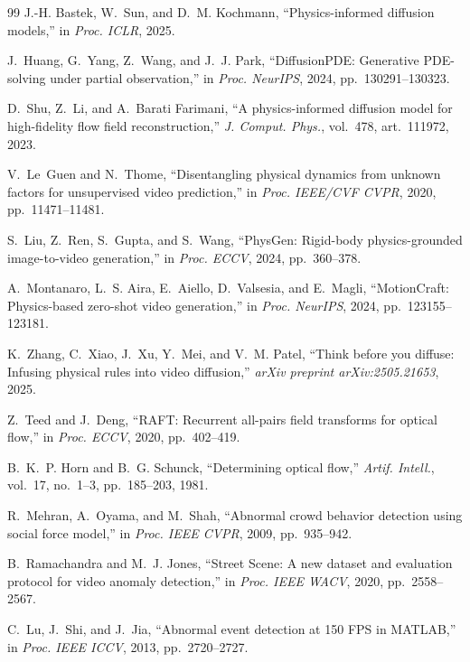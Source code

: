 \documentclass[11pt,a4paper]{article}
\begin{document}
\begin{thebibliography}{99}
J.-H. Bastek, W.~Sun, and D.~M. Kochmann, ``Physics-informed diffusion models,'' in \emph{Proc. ICLR}, 2025.

J.~Huang, G.~Yang, Z.~Wang, and J.~J. Park, ``DiffusionPDE: Generative PDE-solving under partial observation,'' in \emph{Proc. NeurIPS}, 2024, pp.~130291--130323.

D.~Shu, Z.~Li, and A.~Barati Farimani, ``A physics-informed diffusion model for high-fidelity flow field reconstruction,'' \emph{J. Comput. Phys.}, vol.~478, art.~111972, 2023.

V.~Le~Guen and N.~Thome, ``Disentangling physical dynamics from unknown factors for unsupervised video prediction,'' in \emph{Proc. IEEE/CVF CVPR}, 2020, pp.~11471--11481.

S.~Liu, Z.~Ren, S.~Gupta, and S.~Wang, ``PhysGen: Rigid-body physics-grounded image-to-video generation,'' in \emph{Proc. ECCV}, 2024, pp.~360--378.

A.~Montanaro, L.~S. Aira, E.~Aiello, D.~Valsesia, and E.~Magli, ``MotionCraft: Physics-based zero-shot video generation,'' in \emph{Proc. NeurIPS}, 2024, pp.~123155--123181.

K.~Zhang, C.~Xiao, J.~Xu, Y.~Mei, and V.~M. Patel, ``Think before you diffuse: Infusing physical rules into video diffusion,'' \emph{arXiv preprint arXiv:2505.21653}, 2025.

Z.~Teed and J.~Deng, ``RAFT: Recurrent all-pairs field transforms for optical flow,'' in \emph{Proc. ECCV}, 2020, pp.~402--419.

B.~K.~P. Horn and B.~G. Schunck, ``Determining optical flow,'' \emph{Artif. Intell.}, vol.~17, no.~1--3, pp.~185--203, 1981.

R.~Mehran, A.~Oyama, and M.~Shah, ``Abnormal crowd behavior detection using social force model,'' in \emph{Proc. IEEE CVPR}, 2009, pp.~935--942.

B.~Ramachandra and M.~J. Jones, ``Street Scene: A new dataset and evaluation protocol for video anomaly detection,'' in \emph{Proc. IEEE WACV}, 2020, pp.~2558--2567.


C.~Lu, J.~Shi, and J.~Jia, ``Abnormal event detection at 150 FPS in MATLAB,'' in \emph{Proc. IEEE ICCV}, 2013, pp.~2720--2727.


\end{thebibliography}
\end{document}
